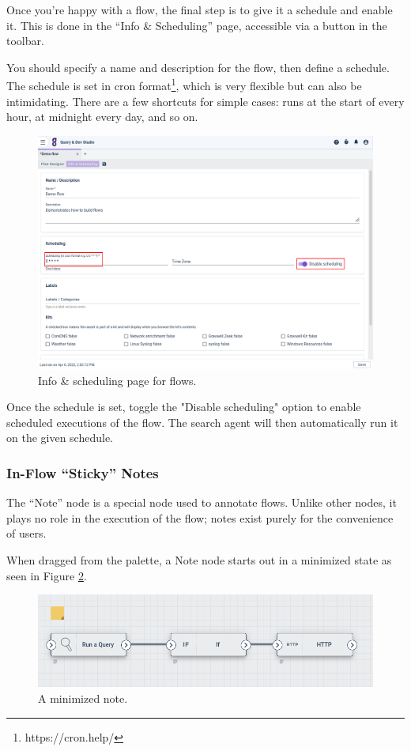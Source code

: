 Once you're happy with a flow, the final step is to give it a schedule and enable it. This is done in the ``Info \& Scheduling'' page, accessible via a button in the toolbar.

You should specify a name and description for the flow, then define a schedule. The schedule is set in cron format\footnote{https://cron.help/}, which is very flexible but can also be intimidating. There are a few shortcuts for simple cases:  runs at the start of every hour,  at midnight every day, and so on.

\begin{figure}
	\includegraphics[width=0.85\linewidth]{images/scheduling.png}
	\caption{Info \& scheduling page for flows.}
	\label{fig:scheduling}
\end{figure}

Once the schedule is set, toggle the "Disable scheduling" option to enable scheduled executions of the flow. The search agent will then automatically run it on the given schedule.

\subsubsection{In-Flow ``Sticky'' Notes}

The ``Note'' node is a special node used to annotate flows. Unlike other nodes, it plays no role in the execution of the flow; notes exist purely for the convenience of users.

When dragged from the palette, a Note node starts out in a minimized state as seen in Figure \ref{fig:note-minimized}.

\begin{figure}
	\includegraphics[width=0.6\linewidth]{images/note-minimized.png}
	\caption{A minimized note.}
	\label{fig:note-minimized}
\end{figure}

